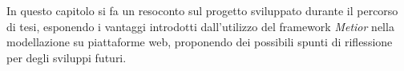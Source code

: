 In questo capitolo si fa un resoconto sul progetto sviluppato durante il percorso di tesi, esponendo i vantaggi introdotti
dall'utilizzo del framework \emph{Metior} nella modellazione su piattaforme web, proponendo dei possibili spunti di riflessione
per degli sviluppi futuri.
